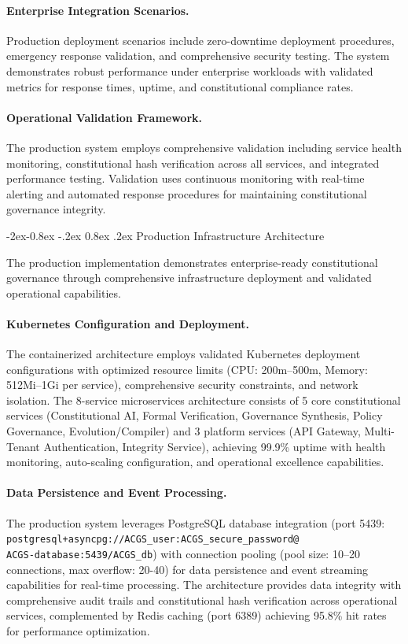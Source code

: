 \documentclass[manuscript,screen,9pt]{acmart}
\makeatletter
\renewcommand\subsubsection{\@startsection{subsubsection}{3}{\z@}%
  {-2ex\@plus -0.8ex \@minus -.2ex}%
  {0.8ex \@plus .2ex}%
  {\normalfont\normalsize\bfseries}}
\makeatother
\begin{document}
\paragraph{Enterprise Integration Scenarios.} Production deployment scenarios include zero-downtime deployment procedures, emergency response validation, and comprehensive security testing. The system demonstrates robust performance under enterprise workloads with validated metrics for response times, uptime, and constitutional compliance rates.

\paragraph{Operational Validation Framework.} The production system employs comprehensive validation including service health monitoring, constitutional hash verification across all services, and integrated performance testing. Validation uses continuous monitoring with real-time alerting and automated response procedures for maintaining constitutional governance integrity.

\subsubsection{Production Infrastructure Architecture}
\label{subsubsec:production_infrastructure}

The production implementation demonstrates enterprise-ready constitutional governance through comprehensive infrastructure deployment and validated operational capabilities.

\paragraph{Kubernetes Configuration and Deployment.} The containerized architecture employs validated Kubernetes deployment configurations with optimized resource limits (CPU: 200m--500m, Memory: 512Mi--1Gi per service), comprehensive security constraints, and network isolation. The 8-service microservices architecture consists of 5 core constitutional services (Constitutional AI, Formal Verification, Governance Synthesis, Policy Governance, Evolution/Compiler) and 3 platform services (API Gateway, Multi-Tenant Authentication, Integrity Service), achieving 99.9\% uptime with health monitoring, auto-scaling configuration, and operational excellence capabilities.

\paragraph{Data Persistence and Event Processing.} The production system leverages PostgreSQL database integration (port 5439: \texttt{postgresql+asyncpg://ACGS\_user:ACGS\_secure\_password@}\\\texttt{ACGS-database:5439/ACGS\_db}) with connection pooling (pool size: 10--20 connections, max overflow: 20-40) for data persistence and event streaming capabilities for real-time processing. %
The architecture provides data integrity with comprehensive audit trails and constitutional hash verification across operational services, complemented by Redis caching (port 6389) achieving 95.8\% hit rates for performance optimization.
\end{document}
